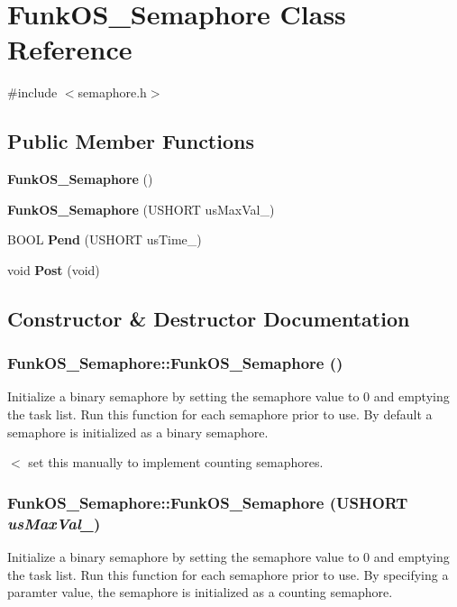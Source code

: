 \section{FunkOS\_\-Semaphore Class Reference}
\label{class_funk_o_s___semaphore}


{\ttfamily \#include $<$semaphore.h$>$}\subsection*{Public Member Functions}
\begin{DoxyCompactItemize}
\item 
{\bf FunkOS\_\-Semaphore} ()
\item 
{\bf FunkOS\_\-Semaphore} (USHORT usMaxVal\_\-)
\item 
BOOL {\bf Pend} (USHORT usTime\_\-)
\item 
void {\bf Post} (void)
\end{DoxyCompactItemize}


\subsection{Constructor \& Destructor Documentation}
\subsubsection[{FunkOS\_\-Semaphore}]{\setlength{\rightskip}{0pt plus 5cm}FunkOS\_\-Semaphore::FunkOS\_\-Semaphore ()}\label{class_funk_o_s___semaphore_add7f26dcbc644a483aa8e5161fef414c}
Initialize a binary semaphore by setting the semaphore value to 0 and emptying the task list. Run this function for each semaphore prior to use. By default a semaphore is initialized as a binary semaphore. 

$<$ set this manually to implement counting semaphores. 
\subsubsection[{FunkOS\_\-Semaphore}]{\setlength{\rightskip}{0pt plus 5cm}FunkOS\_\-Semaphore::FunkOS\_\-Semaphore (USHORT {\em usMaxVal\_\-})}\label{class_funk_o_s___semaphore_a9e409119c649aa0a4ff5ffc900e7d067}
Initialize a binary semaphore by setting the semaphore value to 0 and emptying the task list. Run this function for each semaphore prior to use. By specifying a paramter value, the semaphore is initialized as a counting semaphore. 

